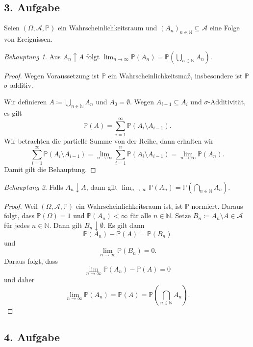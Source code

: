 \documentclass[fleqn,draft,a5paper]{article}
\theoremstyle{remark}
\newtheorem*{Behauptung}{Behauptung}
\begin{document}
\subsection{3. Aufgabe}
Seien \((\Omega, \mathcal{A}, \mathbb{P})\) ein Wahrscheinlichkeitsraum und \((A_{n})_{n \in \mathbb{N}} \subseteq
\mathcal{A}\) eine Folge von Ereignissen.
\begin{Behauptung}
  Aus \(A_{n} \uparrow A\) folgt \(\lim_{n \to \infty} \mathbb{P}(A_{n}) = \mathbb{P} \left(\bigcup_{n \in \mathbb{N}}{A_{n}}\right)\).
\end{Behauptung}
\begin{proof}
  Wegen Voraussetzung ist \(\mathbb{P}\) ein Wahrscheinlichkeitsmaß, insbesondere
  ist \(\mathbb{P}\) \(\sigma\)-additiv.

  Wir definieren \(A \coloneq \bigcup_{n \in \mathbb{N}}{A_{n}}\) und
  \(A_{0} = \emptyset\). Wegen \(A_{i-1} \subseteq A_{i}\) und
  \(\sigma\)-Additivität, es gilt
  \[\mathbb{P}(A) = \sum_{i=1}^{\infty}{\mathbb{P}(A_{i} \setminus A_{i-1})}.\]
  Wir betrachten die partielle Summe von der Reihe, dann erhalten wir
  \[\sum_{i=1}^{\infty}{\mathbb{P}(A_{i} \setminus A_{i-1})} = \lim_{n \to \infty}{\sum_{i=1}^{n}{\mathbb{P}(A_{i}
        \setminus A_{i-1})}} = \lim_{n \to \infty}{\mathbb{P}(A_{n})}.\]
  Damit gilt die Behauptung.
\end{proof}
\begin{Behauptung}
  Falls \(A_{n} \downarrow A\), dann gilt \(\lim_{n \to \infty}{\mathbb{P}(A_{n})} = \mathbb{P}\left(\bigcap_{n \in
    \mathbb{N}} A_{n}\right)\).
\end{Behauptung}
\begin{proof}
  Weil \((\Omega, \mathcal{A}, \mathbb{P})\) ein Wahrscheinlichkeitsraum ist, ist
  \(\mathbb{P}\) normiert.  Daraus folgt, dass \(\mathbb{P}(\Omega) = 1\) und
  \(\mathbb{P}(A_{n}) < \infty\) für alle \(n \in \mathbb{N}\).  Setze
  \(B_{n} \coloneq A_{n} \setminus A \in \mathcal{A}\) für jedes
  \(n \in \mathbb{N}\).  Dann gilt \(B_{n} \downarrow \emptyset\).  Es gilt dann
  \[\mathbb{P}(A_{n}) - \mathbb{P}(A) = \mathbb{P}(B_{n})\]
  und
  \[\lim_{n \to \infty}{\mathbb{P}(B_{n})} = 0.\]
  Daraus folgt, dass
  \[\lim_{n \to \infty}{\mathbb{P}(A_{n}) - \mathbb{P}(A)} = 0\]
  und daher
  \[\lim_{n \to \infty}{\mathbb{P}(A_{n})} = \mathbb{P}(A) = \mathbb{P}\left(\bigcap_{n \in
    \mathbb{N}} A_{n}\right).\]
\end{proof}
\subsection{4. Aufgabe}
\end{document}
